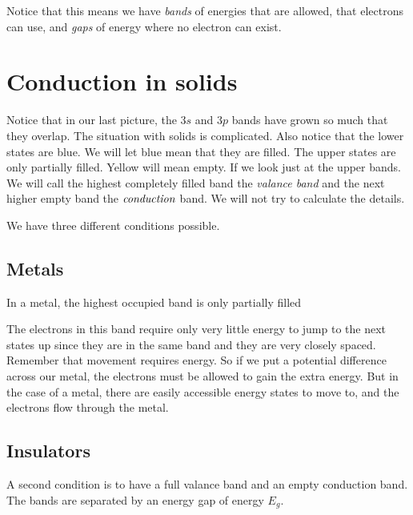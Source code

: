 Notice that this means we have \emph{bands} of energies that are allowed,
that electrons can use, and \emph{gaps} of energy where no electron can
exist.

\section{Conduction in solids}

Notice that in our last picture, the $3s$ and $3p$ bands have grown so much
that they overlap. The situation with solids is complicated. Also notice
that the lower states are blue. We will let blue mean that they are filled.
The upper states are only partially filled. Yellow will mean empty. If we
look just at the upper bands. We will call the highest completely filled
band the \emph{valance band} and the next higher empty band the $\emph{%
	conduction}$ band. We will not try to calculate the details.

We have three different conditions possible.

\subsection{Metals}

In a metal, the highest occupied band is only partially filled


The electrons in this band require only very little energy to jump to the
next states up since they are in the same band and they are very closely
spaced. Remember that movement requires energy. So if we put a potential
difference across our metal, the electrons must be allowed to gain the extra
energy. But in the case of a metal, there are easily accessible energy
states to move to, and the electrons flow through the metal.

\subsection{Insulators}

A second condition is to have a full valance band and an empty conduction
band. The bands are separated by an energy gap of energy $E_{g}.$

